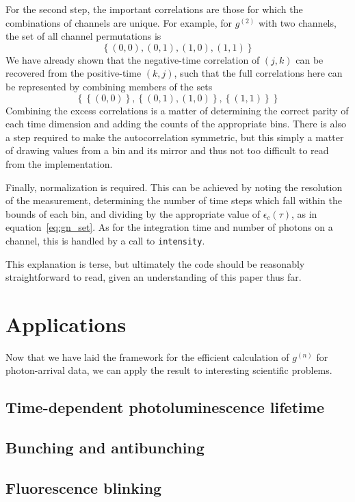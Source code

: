 \documentclass{article}
\newcommand{\braces}[1]{\ensuremath{\left\lbrace #1 \right\rbrace}}
\newcommand{\gn}[1]{\ensuremath{g^{(#1)}}}
\newcommand{\resolution}{\ensuremath{\epsilon}}
\begin{document}
For the second step, the important correlations are those for which the combinations of channels are unique. For example, for \gn{2} with two channels, the set of all channel permutations is
\begin{equation}
\braces{(0,0),(0,1),(1,0),(1,1)}
\end{equation}
We have already shown that the negative-time correlation of $(j,k)$ can be recovered from the positive-time $(k,j)$, such that the full correlations here can be represented by combining members of the sets
\begin{equation}
\braces{\braces{(0,0)},\braces{(0,1),(1,0)},\braces{(1,1)}}
\end{equation}
Combining the excess correlations is a matter of determining the correct parity of each time dimension and adding the counts of the appropriate bins. There is also a step required to make the autocorrelation symmetric, but this simply a matter of drawing values from a bin and its mirror and thus not too difficult to read from the implementation.

Finally, normalization is required. This can be achieved by noting the resolution of the measurement,  determining the number of time steps which fall within the bounds of each bin, and dividing by the appropriate value of $\resolution_{c}(\tau)$, as in equation~\ref{eq:gn_set}. As for the integration time and number of photons on a channel, this is handled by a call to \texttt{intensity}.

This explanation is terse, but ultimately the code should be reasonably straightforward to read, given an understanding of this paper thus far.

\section{Applications}
Now that we have laid the framework for the efficient calculation of \gn{n} for photon-arrival data, we can apply the result to interesting scientific problems.

\subsection{Time-dependent photoluminescence lifetime}
\subsection{Bunching and antibunching}
\subsection{Fluorescence blinking}
\end{document}
